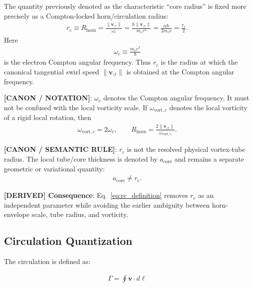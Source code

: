 \documentclass[11pt]{article}
\theoremstyle{definition}
\theoremstyle{plain}
\theoremstyle{remark}
\newcommand{\rc}{{r_c}}
\newcommand{\vnorm}{\lVert \mathbf{v}_{\!\boldsymbol{\circlearrowleft}} \rVert}
\begin{document}
        The quantity previously denoted as the characteristic ``core radius'' is fixed more precisely as a
        Compton-locked horn/circulation radius:
        \begin{align}
            \rc \equiv R_{\mathrm{horn}}
            = \frac{\vnorm}{\omega_c}
            = \frac{\hbar\vnorm}{m_e c^2}
            = \frac{\alpha\hbar}{2m_e c}
            = \frac{r_e}{2}.
            \label{eq:rc_definition}
        \end{align}
        Here
        \begin{align}
            \omega_c \equiv \frac{m_e c^2}{\hbar}
            \label{eq:omega_c_compton}
        \end{align}
        is the electron Compton angular frequency. Thus $\rc$ is the radius at which the canonical
        tangential swirl speed $\vnorm$ is obtained at the Compton angular frequency.

        \textbf{[CANON / NOTATION]}: $\omega_c$ denotes the Compton angular frequency. It must not be confused with the local vorticity scale. If $\omega_{\mathrm{vort},c}$ denotes the local vorticity of a rigid local rotation, then
        \begin{align}
            \omega_{\mathrm{vort},c}=2\omega_c,
            \qquad
            R_{\mathrm{horn}}=\frac{2\vnorm}{\omega_{\mathrm{vort},c}}.
        \end{align}

        \textbf{[CANON / SEMANTIC RULE]}: $\rc$ is not the resolved physical vortex-tube radius. The local tube/core thickness is denoted by $a_{\mathrm{core}}$ and remains a separate geometric or variational quantity:
        \begin{align}
            a_{\mathrm{core}} \neq \rc.
        \end{align}

        \textbf{[DERIVED] Consequence}: Eq.~\eqref{eq:rc_definition} removes $\rc$ as an independent parameter while avoiding the earlier ambiguity between horn-envelope scale, tube radius, and vorticity.
    
    \subsection{Circulation Quantization}
        
        The circulation is defined as:
        
        \begin{align}
            \Gamma = \oint \mathbf{v} \cdot d\ell
        \end{align}
        
\end{document}
